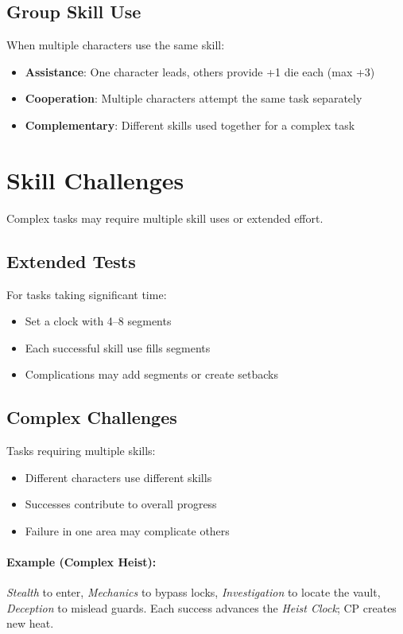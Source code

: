 \begin{multicols}{2}
\subsection*{Group Skill Use}
When multiple characters use the same skill:
\begin{itemize}
\item \textbf{Assistance}: One character leads, others provide +1 die each (max +3)
\item \textbf{Cooperation}: Multiple characters attempt the same task separately
\item \textbf{Complementary}: Different skills used together for a complex task
\end{itemize}

\section{Skill Challenges}

Complex tasks may require multiple skill uses or extended effort.

\subsection*{Extended Tests}
For tasks taking significant time:
\begin{itemize}
\item Set a clock with 4--8 segments
\item Each successful skill use fills segments
\item Complications may add segments or create setbacks
\end{itemize}

\subsection*{Complex Challenges}
Tasks requiring multiple skills:
\begin{itemize}
\item Different characters use different skills
\item Successes contribute to overall progress
\item Failure in one area may complicate others
\end{itemize}

\paragraph{Example (Complex Heist):}
\emph{Stealth} to enter, \emph{Mechanics} to bypass locks, \emph{Investigation} to locate the vault, \emph{Deception} to mislead guards. Each success advances the \emph{Heist Clock}; CP creates new heat.


\end{multicols}
